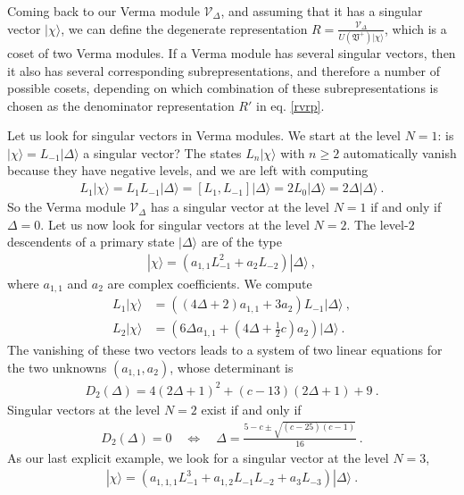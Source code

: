 \documentclass[12pt,a4paper,notitlepage]{report}
\numberwithin{equation}{section}
\theoremstyle{break}
\begin{document}
Coming back to our Verma module $\mathcal{V}_\Delta$, and assuming that it has a singular vector $|\chi\rangle$, we can define the degenerate representation $R = \frac{\mathcal{V}_\Delta}{U(\mathfrak{V}^+)|\chi\rangle}$, which is a coset of two Verma modules.
If a Verma module has several singular vectors, then it also has several corresponding subrepresentations, and therefore a number of possible cosets, depending on which combination of these subrepresentations is chosen as the denominator representation $R'$ in eq. \eqref{rvrp}.

Let us look for singular vectors in Verma modules.
We start at the level $N=1$: is $|\chi\rangle=L_{-1}|\Delta\rangle$ a singular vector? The states $L_n|\chi\rangle$ with $n\geq 2$ automatically vanish because they have negative levels, and we are left with computing
\begin{align}
 L_1|\chi\rangle = L_1 L_{-1}|\Delta\rangle = [L_1,L_{-1}]|\Delta\rangle = 2L_0 |\Delta\rangle = 2\Delta|\Delta\rangle\ .
\end{align}
So the Verma module $\mathcal{V}_\Delta$ has a singular vector at the level $N=1$ if and only if $\Delta = 0$.
Let us now look for singular vectors at the level $N=2$.
The level-$2$ descendents of a primary state $|\Delta\rangle$ are of the type
\begin{align}
 |\chi\rangle = \left(a_{1,1} L_{-1}^2 + a_2 L_{-2}\right) |\Delta\rangle\ ,
\end{align}
where $a_{1,1}$ and $a_2$ are complex coefficients.
We compute 
\begin{align}
 L_1|\chi\rangle &= \left((4\Delta+2)a_{1,1} + 3a_2\right) L_{-1}|\Delta\rangle\ ,
\\
L_2 |\chi \rangle &= \left(6\Delta a_{1,1}+(4\Delta+\tfrac12 c) a_2\right)|\Delta\rangle\ .
\end{align}
The vanishing of these two vectors leads to a system of two linear equations for the two unknowns $(a_{1,1},a_2)$, whose determinant is 
\begin{align}
 D_2(\Delta) = 4(2\Delta+1)^2 +(c-13)(2\Delta+1) +9\ . 
\label{dud}
\end{align}
Singular vectors at the level $N=2$ exist if and only if
\begin{align}
D_2(\Delta)=0 \quad \Leftrightarrow \quad \Delta = \frac{5-c\pm \sqrt{(c-25)(c-1)}}{16}\ .
\label{dcscc}
\end{align}
As our last explicit example, we look for a singular vector at the level $N=3$,
\begin{align}
 |\chi\rangle = \left(a_{1,1,1} L_{-1}^3 + a_{1,2}L_{-1}L_{-2} + a_3 L_{-3}\right) |\Delta\rangle\ .
\end{align}
\end{document}
